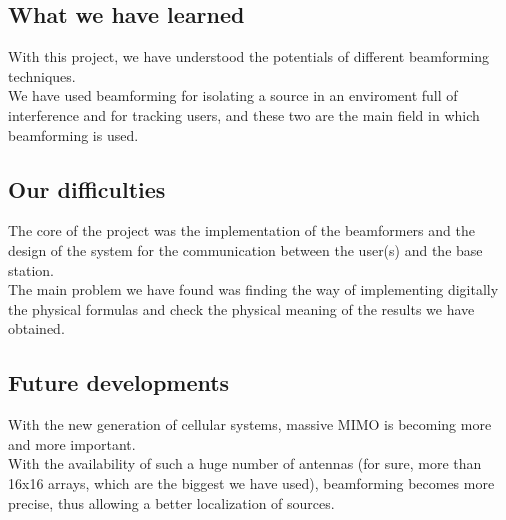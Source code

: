 \subsection{What we have learned}

With this project, we have understood the potentials of different beamforming techniques.\\
We have used beamforming for isolating a source in an enviroment full of interference and for tracking users,
and these two are the main field in which beamforming is used. 

\subsection{Our difficulties}

The core of the project was the implementation of the beamformers and the design of the system for the communication 
between the user(s) and the base station.\\
The main problem we have found was finding the way of implementing digitally the physical formulas and check the physical meaning 
of the results we have obtained.

\subsection{Future developments}

With the new generation of cellular systems, massive MIMO is becoming more and more important.\\ 
With the availability of such a huge number of antennas (for sure, more than 16x16 arrays, which are the biggest we 
have used), beamforming becomes more precise, thus allowing a better localization of sources. 